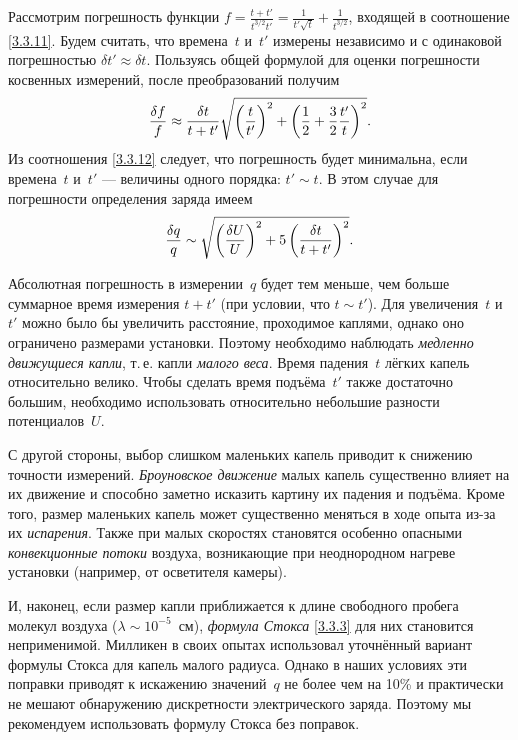 Рассмотрим погрешность функции
$f=\frac{t+t'}{t^{3/2}t'} = \frac{1}{t'\sqrt{t}} + \frac{1}{t^{3/2}}$,
входящей в соотношение \eqref{3.3.11}.
Будем считать, что времена~$t$ и~$t'$ 
измерены независимо и с одинаковой погрешностью $\delta {t'}\approx \delta t$.
Пользуясь общей формулой для оценки погрешности косвенных 
измерений, после преобразований получим
\begin{equation}
\frac{\delta f}{f} \approx 
\frac{\delta t}{t+t'} 
\sqrt{\left(\frac{t}{t'} \right)^2 + 
    \left(\frac12 + \frac32 \frac{t'}{t}\right)^2}.
\eqmark{3.3.12}
\end{equation}
Из соотношения \eqref{3.3.12} следует, что погрешность будет минимальна, 
если времена~$t$ и~$t'$ --- величины одного порядка: $t'\sim t$.
В этом случае для погрешности определения заряда имеем
\begin{equation}
	\frac{\delta q}{q} \sim 
    \sqrt{\left(\frac{\delta U}{U}\right)^2 + 5 \left(\frac{\delta t}{t+t'}\right)^2}.
	\eqmark{3.3.13}
\end{equation}

Абсолютная погрешность в измерении~$q$ будет тем меньше, 
чем больше суммарное время измерения $t+t'$ (при условии, что $t\sim t'$). 
Для увеличения~$t$ и~$t'$ можно было бы увеличить
расстояние, проходимое каплями, однако оно ограничено размерами установки. 
Поэтому необходимо наблюдать \emph{медленно движущиеся капли}, т.\,е. 
капли \emph{малого веса}. 
Время падения~$t$ лёгких капель относительно велико. 
Чтобы сделать время подъёма~$t'$ также достаточно большим, необходимо
использовать относительно небольшие разности потенциалов~$U$.

С другой стороны, выбор слишком маленьких капель приводит к снижению точности
измерений. \emph{Броуновское движение} малых капель существенно влияет на
их движение и способно заметно исказить картину их падения и подъёма. 
Кроме того, размер маленьких капель может существенно меняться
в ходе опыта из-за их \emph{испарения}. 
Также при малых скоростях становятся особенно 
опасными \emph{конвекционные потоки} воздуха, возникающие при неоднородном нагреве
установки (например, от осветителя камеры). 

И, наконец, если размер капли приближается к длине свободного пробега
молекул воздуха ($\lambda \sim 10^{-5}$~см), \emph{формула Стокса} \eqref{3.3.3}
для них становится неприменимой. 
Милликен в своих опытах использовал уточнённый вариант формулы Стокса 
для капель малого радиуса. 
Однако в наших условиях эти поправки приводят к искажению значений~$q$ не более
чем на 10\% и практически не мешают обнаружению дискретности электрического заряда. 
Поэтому мы рекомендуем использовать формулу Стокса без поправок.

